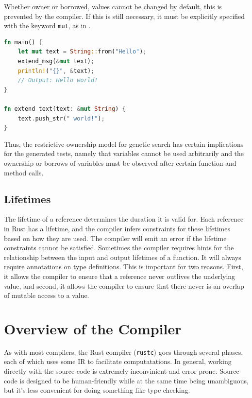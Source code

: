 \documentclass[paper=a4,%
  twoside,%
  BCOR4mm,%
  abstract=true,%
  toc=bibliography,%
  chapterprefix=true,%
  toc=bibliographynumbered,%
  open=right,%
  english,%
  pagesize=pdftex]{scrreprt}
\begin{document}
Whether owner or borrowed, values cannot be changed by default, this is prevented by the compiler. If this is still necessary, it must be explicitly specified with the keyword \lstinline{mut}, as in .

\begin{lstlisting}[language=Rust, style=boxed, caption=Transferring the ownership to a method, label=lst:mut-borrowing-method-call]
fn main() {
    let mut text = String::from("Hello");
    extend_msg(&mut text);
    println!("{}", &text);
    // Output: Hello world!
}

fn extend_text(text: &mut String) {
    text.push_str(" world!");
}
\end{lstlisting}

Thus, the restrictive ownership model for genetic search has certain implications for the generated tests, namely that variables cannot be used arbitrarily and the ownership or borrows of variables must be observed after certain function and method calls.

\subsection{Lifetimes}
The lifetime of a reference determines the duration it is valid for. Each reference in Rust has a lifetime, and the compiler infers constraints for these lifetimes based on how they are used. The compiler will emit an error if the lifetime constraints cannot be satisfied. Sometimes the compiler requires hints for the relationship between the input and output lifetimes of a function. It will always require annotations on type definitions. This is important for two reasons. First, it allows the compiler to ensure that a reference never outlives the underlying value, and second, it allows the compiler to ensure that there never is an overlap of mutable access to a value.

\section{Overview of the Compiler}
As with most compilers, the Rust compiler (\lstinline{rustc}) goes through several phases, each of which uses some \ac{IR} to facilitate computatations. In general, working directly with the source code is extremely inconvinient and error-prone. Source code is designed to be human-friendly while at the same time being unambiguous, but it's less convenient for doing something like type checking.
\end{document}
